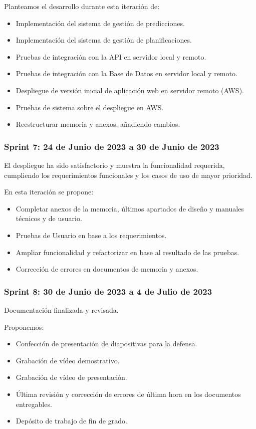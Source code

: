 Planteamos el desarrollo durante esta iteración de:

\begin{itemize}
    \item Implementación del sistema de gestión de predicciones.
    \item Implementación del sistema de gestión de planificaciones.
    \item Pruebas de integración con la API en servidor local y remoto.
    \item Pruebas de integración con la Base de Datos en servidor local y remoto.
    \item Despliegue de versión inicial de aplicación web en servidor remoto (AWS).
    \item Pruebas de sistema sobre el despliegue en AWS.
    \item Reestructurar memoria y anexos, añadiendo cambios.
\end{itemize}

\subsubsection{Sprint 7: 24 de Junio de 2023 a 30 de Junio de 2023}

El despliegue ha sido satisfactorio y muestra la funcionalidad requerida, cumpliendo los requerimientos funcionales y los casos de uso de mayor prioridad.

En esta iteración se propone:

\begin{itemize}
    \item Completar anexos de la memoria, últimos apartados de diseño y manuales técnicos y de usuario.
    \item Pruebas de Usuario en base a los requerimientos.
    \item Ampliar funcionalidad y refactorizar en base al resultado de las pruebas.
    \item Corrección de errores en documentos de memoria y anexos.
\end{itemize}

\subsubsection{Sprint 8: 30 de Junio de 2023 a 4 de Julio de 2023}

Documentación finalizada y revisada.

Proponemos:
\begin{itemize}
    \item Confección de presentación de diapositivas para la defensa.
    \item Grabación de vídeo demostrativo.
    \item Grabación de vídeo de presentación.
    \item Última revisión y corrección de errores de última hora en los documentos entregables.
    \item Depósito de trabajo de fin de grado.
\end{itemize}

